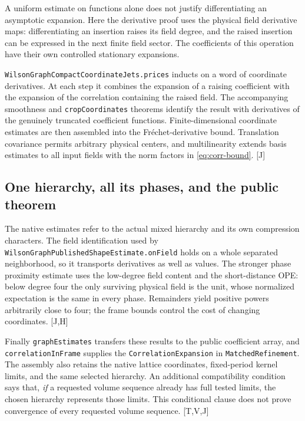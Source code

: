 \documentclass[11pt]{article}
\newcommand{\code}[1]{{\small\nolinkurl{#1}}}
\newcommand{\src}[1]{\textsf{[#1]}}
\begin{document}
A uniform estimate on functions alone does not justify differentiating
an asymptotic expansion. Here the derivative proof uses the physical
field derivative maps: differentiating an insertion raises its field
degree, and the raised insertion can be expressed in the next finite
field sector. The coefficients of this operation have their own
controlled stationary expansions.

\code{WilsonGraphCompactCoordinateJets.prices} inducts on a word of
coordinate derivatives. At each step it combines the expansion of a
raising coefficient with the expansion of the correlation containing
the raised field. The accompanying smoothness and
\code{cropCoordinates} theorems identify the result with derivatives
of the genuinely truncated coefficient functions. Finite-dimensional
coordinate estimates are then assembled into the Fr\'echet-derivative
bound. Translation covariance permits arbitrary physical centers,
and multilinearity extends basis estimates to all input fields with
the norm factors in \eqref{eq:corr-bound}. \src{J}

\subsection{One hierarchy, all its phases, and the public theorem}

The native estimates refer to the actual mixed hierarchy and its own
compression characters. The field identification used by
\code{WilsonGraphPublishedShapeEstimate.onField} holds on a whole
separated neighborhood, so it transports derivatives as well as values.
The stronger phase proximity estimate uses the low-degree field content
and the short-distance OPE: below degree four the only surviving
physical field is the unit, whose normalized expectation is the same
in every phase. Remainders yield positive powers arbitrarily close
to four; the frame bounds control the cost of changing coordinates.
\src{J,H}

Finally \code{graphEstimates} transfers these results to the public
coefficient array, and \code{correlationInFrame} supplies the
\code{CorrelationExpansion} in \code{MatchedRefinement}. The assembly
also retains the native lattice coordinates, fixed-period kernel limits,
and the same selected hierarchy. An additional compatibility condition
says that, \emph{if} a requested volume sequence already has full tested
limits, the chosen hierarchy represents those limits. This conditional
clause does not prove convergence of every requested volume sequence.
\src{T,V,J}
\end{document}
